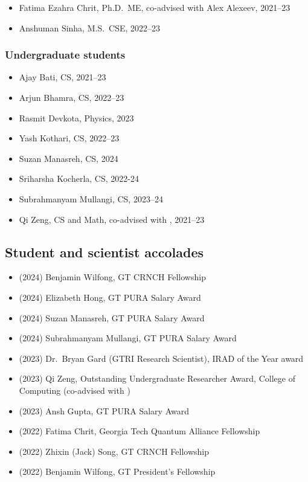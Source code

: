 \begin{itemize}
    \item Fatima Ezahra Chrit, Ph.D.\ ME, co-advised with Alex Alexeev, 2021--23
    \item Anshuman Sinha, M.S.\ CSE, 2022--23
\end{itemize}

\subsubsection{Undergraduate students}

\begin{itemize}
    \item Ajay Bati, CS, 2021--23
    \item Arjun Bhamra, CS, 2022--23
    \item Rasmit Devkota, Physics, 2023
    \item Yash Kothari, CS, 2022--23
    \item Suzan Manasreh, CS, 2024
    \item Sriharsha Kocherla, CS, 2022-24
    \item Subrahmanyam Mullangi, CS, 2023--24
    \item Qi Zeng, CS and Math, co-advised with \Florian, 2021--23
\end{itemize}

\subsection{Student and scientist accolades}

\begin{itemize}
    \item (2024) Benjamin Wilfong, GT CRNCH Fellowship
    \item (2024) Elizabeth Hong, GT PURA Salary Award
    \item (2024) Suzan Manasreh, GT PURA Salary Award
    \item (2024) Subrahmanyam Mullangi, GT PURA Salary Award
    \item (2023) Dr.\ Bryan Gard (GTRI Research Scientist), IRAD of the Year award
    \item (2023) Qi Zeng, Outstanding Undergraduate Researcher Award, College of Computing (co-advised with \Florian)
    \item (2023) Ansh Gupta, GT PURA Salary Award
    \item (2022) Fatima Chrit, Georgia Tech Quantum Alliance Fellowship
    \item (2022) Zhixin (Jack) Song, GT CRNCH Fellowship
    \item (2022) Benjamin Wilfong, GT President's Fellowship
\end{itemize}

